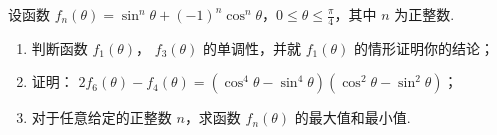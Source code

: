 \begin{problem}

设函数 \(f_{n}(\theta)=\sin^{n}\theta+(-1)^{n}\cos^{n}\theta\)，\(0\leq\theta\leq\frac{\pi}{4}\)，其中 \(n\) 为正整数.

\begin{enumerate}
\item 判断函数 \( f_{1}(\theta) \)， \( f_{3}(\theta) \) 的单调性，并就 \( f_{1}(\theta) \) 的情形证明你的结论；
\item 证明： \( 2f_{6}(\theta)-f_{4}(\theta)=\left(\cos^{4}\theta-\sin^{4}\theta\right)\left(\cos^{2}\theta-\sin^{2}\theta\right) \)；
\item 对于任意给定的正整数 \( n \)，求函数 \( f_{n}(\theta) \) 的最大值和最小值.
\end{enumerate}
\end{problem}

